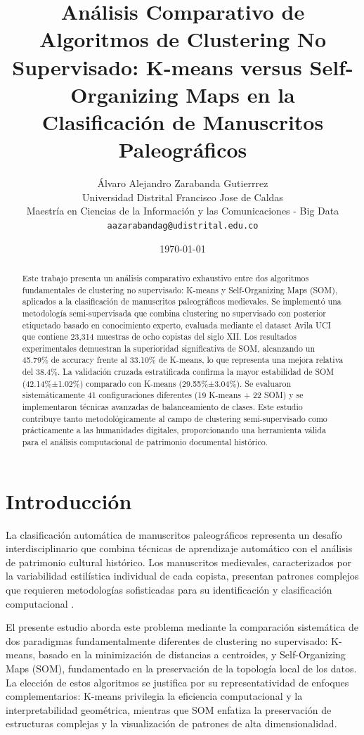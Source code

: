 \documentclass[12pt,a4paper]{article}
\title{\textbf{Análisis Comparativo de Algoritmos de Clustering No Supervisado: K-means versus Self-Organizing Maps en la Clasificación de Manuscritos Paleográficos}}
\author{
    Álvaro Alejandro Zarabanda Gutierrrez \\
    \small Universidad Distrital Francisco Jose de Caldas \\
    \small Maestría en Ciencias de la Información y las Comunicaciones - Big Data \\
    \small \texttt{aazarabandag@udistrital.edu.co}
}
\date{\today}
\begin{document}
\maketitle

\begin{abstract}
Este trabajo presenta un análisis comparativo exhaustivo entre dos algoritmos fundamentales de clustering no supervisado: K-means y Self-Organizing Maps (SOM), aplicados a la clasificación de manuscritos paleográficos medievales. Se implementó una metodología semi-supervisada que combina clustering no supervisado con posterior etiquetado basado en conocimiento experto, evaluada mediante el dataset Avila UCI que contiene 23,314 muestras de ocho copistas del siglo XII. Los resultados experimentales demuestran la superioridad significativa de SOM, alcanzando un 45.79\% de accuracy frente al 33.10\% de K-means, lo que representa una mejora relativa del 38.4\%. La validación cruzada estratificada confirma la mayor estabilidad de SOM (42.14\%±1.02\%) comparado con K-means (29.55\%±3.04\%). Se evaluaron sistemáticamente 41 configuraciones diferentes (19 K-means + 22 SOM) y se implementaron técnicas avanzadas de balanceamiento de clases. Este estudio contribuye tanto metodológicamente al campo de clustering semi-supervisado como prácticamente a las humanidades digitales, proporcionando una herramienta válida para el análisis computacional de patrimonio documental histórico.
\end{abstract}

\tableofcontents
\newpage

\section{Introducción}

La clasificación automática de manuscritos paleográficos representa un desafío interdisciplinario que combina técnicas de aprendizaje automático con el análisis de patrimonio cultural histórico. Los manuscritos medievales, caracterizados por la variabilidad estilística individual de cada copista, presentan patrones complejos que requieren metodologías sofisticadas para su identificación y clasificación computacional \cite{kestemont2017}.

El presente estudio aborda este problema mediante la comparación sistemática de dos paradigmas fundamentalmente diferentes de clustering no supervisado: K-means, basado en la minimización de distancias a centroides, y Self-Organizing Maps (SOM), fundamentado en la preservación de la topología local de los datos. La elección de estos algoritmos se justifica por su representatividad de enfoques complementarios: K-means privilegia la eficiencia computacional y la interpretabilidad geométrica, mientras que SOM enfatiza la preservación de estructuras complejas y la visualización de patrones de alta dimensionalidad.
\end{document}
